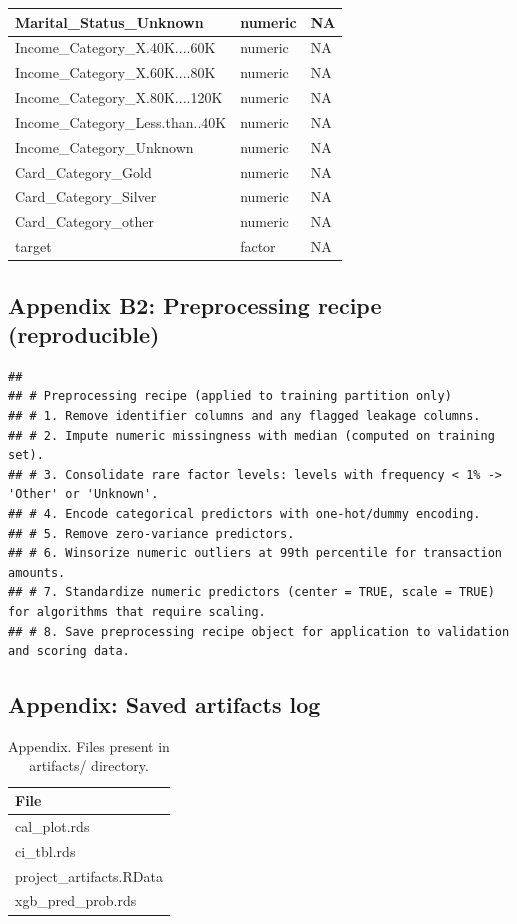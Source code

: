 \documentclass[
  12pt,
]{article}
\begin{document}
\begin{table}[!h]
\begin{tabular}[t]{l|l|l}
\hline
Marital\_Status\_Unknown & numeric & NA\\
\hline
Income\_Category\_X.40K....60K & numeric & NA\\
\hline
Income\_Category\_X.60K....80K & numeric & NA\\
\hline
Income\_Category\_X.80K....120K & numeric & NA\\
\hline
Income\_Category\_Less.than..40K & numeric & NA\\
\hline
Income\_Category\_Unknown & numeric & NA\\
\hline
Card\_Category\_Gold & numeric & NA\\
\hline
Card\_Category\_Silver & numeric & NA\\
\hline
Card\_Category\_other & numeric & NA\\
\hline
target & factor & NA\\
\hline
\end{tabular}
\end{table}

\subsection{Appendix B2: Preprocessing recipe
(reproducible)}\label{appendix-b2-preprocessing-recipe-reproducible}

\begin{verbatim}
## 
## # Preprocessing recipe (applied to training partition only)
## # 1. Remove identifier columns and any flagged leakage columns.
## # 2. Impute numeric missingness with median (computed on training set).
## # 3. Consolidate rare factor levels: levels with frequency < 1% -> 'Other' or 'Unknown'.
## # 4. Encode categorical predictors with one-hot/dummy encoding.
## # 5. Remove zero-variance predictors.
## # 6. Winsorize numeric outliers at 99th percentile for transaction amounts.
## # 7. Standardize numeric predictors (center = TRUE, scale = TRUE) for algorithms that require scaling.
## # 8. Save preprocessing recipe object for application to validation and scoring data.
\end{verbatim}

\subsection{Appendix: Saved artifacts
log}\label{appendix-saved-artifacts-log}

\begin{table}[!h]
\centering
\caption{\label{tab:appendix-artifacts-log}Appendix. Files present in artifacts/ directory.}
\centering
\begin{tabular}[t]{l}
\hline
File\\
\hline
cal\_plot.rds\\
\hline
ci\_tbl.rds\\
\hline
project\_artifacts.RData\\
\hline
xgb\_pred\_prob.rds\\
\hline
\end{tabular}
\end{table}
\end{document}

